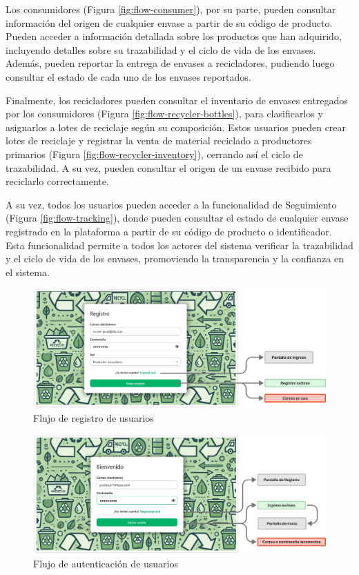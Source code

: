 Los consumidores (Figura \ref{fig:flow-consumer}), por su parte, pueden consultar información del origen de cualquier envase a partir de su código de producto. Pueden acceder a información detallada sobre los productos que han adquirido, incluyendo detalles sobre su trazabilidad y el ciclo de vida de los envases. Además, pueden reportar la entrega de envases a recicladores, pudiendo luego consultar el estado de cada uno de los envases reportados.

Finalmente, los recicladores pueden consultar el inventario de envases entregados por los consumidores (Figura \ref{fig:flow-recycler-bottles}), para clasificarlos y asignarlos a lotes de reciclaje según su composición. Estos usuarios pueden crear lotes de reciclaje y registrar la venta de material reciclado a productores primarios (Figura \ref{fig:flow-recycler-inventory}), cerrando así el ciclo de trazabilidad. A su vez, pueden consultar el origen de un envase recibido para reciclarlo correctamente.

A su vez, todos los usuarios pueden acceder a la funcionalidad de Seguimiento (Figura \ref{fig:flow-tracking}), donde pueden consultar el estado de cualquier envase registrado en la plataforma a partir de su código de producto o identificador. Esta funcionalidad permite a todos los actores del sistema verificar la trazabilidad y el ciclo de vida de los envases, promoviendo la transparencia y la confianza en el sistema.

\begin{figure}[!htb]
	\centering
	\includegraphics[width=\linewidth]{Figures/flow-register.png}
	\caption{Flujo de registro de usuarios}
  \label{fig:flow-register}
\end{figure}

\begin{figure}[!htb]
	\centering
	\includegraphics[width=\linewidth]{Figures/flow-login.png}
	\caption{Flujo de autenticación de usuarios}
	\label{fig:flow-login}
\end{figure}

